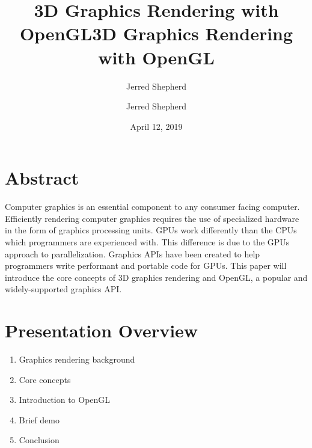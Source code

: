 \documentclass{article}
\title{\Large\textbf{3D Graphics Rendering with OpenGL}}
\author{Jerred Shepherd}
\begin{document}
  \title{3D Graphics Rendering with OpenGL}
  \author{Jerred Shepherd}
  \date{April 12, 2019}
  \maketitle
  
  \section{Abstract}
  Computer graphics is an essential component to any consumer facing computer. Efficiently rendering computer graphics requires the use of specialized hardware in the form of graphics processing units. GPUs work differently than the CPUs which programmers are experienced with. This difference is due to the GPUs approach to parallelization. Graphics APIs have been created to help programmers write performant and portable code for GPUs. This paper will introduce the core concepts of 3D graphics rendering and OpenGL, a popular and widely-supported graphics API.
  
  \section{Presentation Overview}
  \begin{enumerate}
    \itemsep0em
    \item Graphics rendering background
    \item Core concepts
    \item Introduction to OpenGL
    \item Brief demo
    \item Conclusion
  \end{enumerate}
    
  \printglossaries
  
\end{document}
